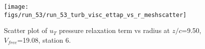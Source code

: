 \begin{figure}[H]
\centering
\texttt{[image: figs/run\_53/run\_53\_turb\_visc\_ettap\_vs\_r\_meshscatter]}
\caption{Scatter plot of $
u_T$ pressure relaxation term vs radius at $z/c$=9.50, $V_{free}$=19.08, station 6.}
\end{figure}


